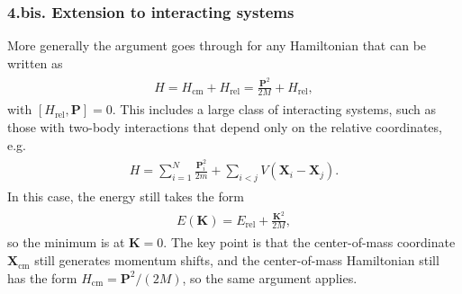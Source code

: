 \documentclass[../QFT_main.tex]{subfiles}
\begin{document}
\subsubsection*{4.bis. Extension to interacting systems}
More generally the argument goes through for any Hamiltonian that can be written as
{\small\begin{align}
\begin{aligned}
    H=H_{\text{cm}}+H_{\text{rel}}=\frac{\mathbf{P}^2}{2M}+H_{\text{rel}},
\end{aligned}
\end{align}}
with $[H_{\text{rel}},\mathbf{P}]=0$.
This includes a large class of interacting systems, such as those with two-body interactions that depend only on the relative coordinates, e.g.
{\small\begin{align}
\begin{aligned}
    H=\sum_{i=1}^N \frac{\mathbf{P}_i^2}{2m}+\sum_{i<j}V(\mathbf{X}_i-\mathbf{X}_j).
\end{aligned}\end{align}}
In this case, the energy still takes the form
{\small\begin{align}
\begin{aligned}
    E(\mathbf{K})=E_{\text{rel}}+\frac{\mathbf{K}^2}{2M},
\end{aligned}\end{align}}
so the minimum is at $\mathbf{K}=0$.
The key point is that the center-of-mass coordinate $\mathbf{X}_{\text{cm}}$ still generates momentum shifts, and the center-of-mass Hamiltonian still has the form $H_{\text{cm}}=\mathbf{P}^2/(2M)$, so the same argument applies.
\end{document}
